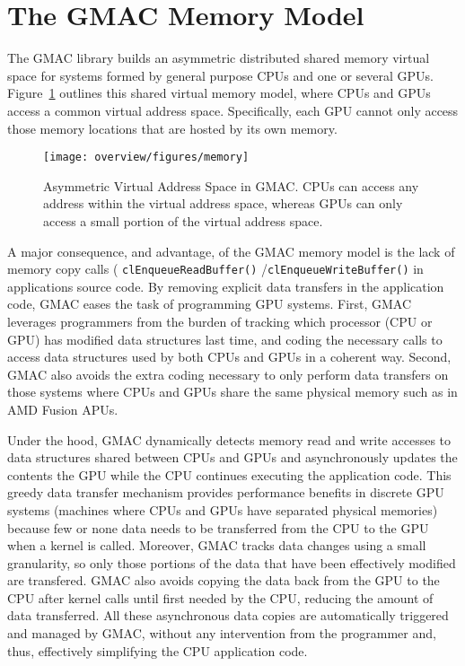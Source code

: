 \section{The GMAC Memory Model}

The GMAC library builds an asymmetric distributed shared memory virtual space for systems formed by 
general purpose CPUs and one or several GPUs. Figure~\ref{fig:overview:memory} outlines this shared 
virtual memory model, where CPUs and GPUs access a common virtual address space. Specifically, each 
GPU cannot only access those memory locations that are hosted by its own memory.

\begin{figure}
\centering
\texttt{[image: overview/figures/memory]}
\caption{Asymmetric Virtual Address Space in GMAC\@. CPUs can access any address within the virtual 
address space, whereas GPUs can only access a small portion of the virtual address space.}
\label{fig:overview:memory}
\end{figure}

A major consequence, and advantage, of the GMAC memory model is the lack of memory copy calls (\eg 
\texttt{clEnqueue\-Read\-Buffer()} \slash \texttt{clEnqueue\-Write\-Buffer()} in applications source 
code.  By removing explicit data transfers in the application code, GMAC eases the task of 
programming GPU systems. First, GMAC leverages programmers from the burden of tracking which 
processor (\ie CPU or GPU) has modified data structures last time, and coding the necessary calls to 
access data structures used by both CPUs and GPUs in a coherent way. Second, GMAC also avoids the 
extra coding necessary to only perform data transfers on those systems where CPUs and GPUs share the 
same physical memory such as in AMD Fusion APUs.

Under the hood, GMAC dynamically detects memory read and write accesses to data structures shared 
between CPUs and GPUs and asynchronously updates the contents the GPU while the CPU continues 
executing the application code. This greedy data transfer mechanism provides performance benefits in 
discrete GPU systems (\ie machines where CPUs and GPUs have separated physical memories) because few 
or none data needs to be transferred from the CPU to the GPU when a kernel is called. Moreover, GMAC 
tracks data changes using a small granularity, so only those portions of the data that have been 
effectively modified are transfered. GMAC also avoids copying the data back from the GPU to the CPU 
after kernel calls until first needed by the CPU, reducing the amount of data transferred. All these 
asynchronous data copies are automatically triggered and managed by GMAC, without any intervention 
from the programmer and, thus, effectively simplifying the CPU application code.

